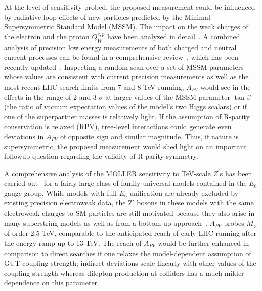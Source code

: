 At the level of sensitivity probed, the proposed measurement could be influenced by radiative loop effects of new 
particles predicted by the Minimal Supersymmetric Standard Model (MSSM). The impact on the weak charges of the
electron and the proton $Q_W^{e,p}$ have been analyzed in detail~\cite{ref:cl:Kurylov:2003zh}. A combined analysis of 
precision low energy measurements of both charged and neutral current processes can be found in a comprehensive review~\cite{ref:cl:RamseyMusolf:2006vr}, which has been recently updated~\cite{ref:cl:Erler:2013xha}. 
Inspecting a random scan over a set of MSSM parameters whose values are consistent with current precision 
measurements as well as the most recent LHC search limits from 7 and 8 TeV running, $A_{PV}$ would see 
in the effects in the range of 2 and 3 $\sigma$ at larger values of the MSSM parameter $\tan\beta$ (the ratio of vacuum expectation values of the model's two Higgs scalars) or if one of the superpartner 
masses is relatively light. 
If the assumption of R-parity conservation is relaxed (RPV), tree-level interactions could generate even deviations 
in $A_{PV}$ of opposite sign and similar magnitude. Thus, if nature is supersymmetric, the proposed measurement
would shed light on an important followup question regarding the validity of R-parity symmetry.

A comprehensive analysis of the MOLLER sensitivity to 
TeV-scale $Z^\prime$s has been carried out~\cite{ref:cl:Erler:2011iw} 
for a fairly large class of family-universal models
contained in the $E_6$ gauge group.  While models with full $E_6$ unification are already
excluded by existing precision electroweak data, the Z' bosons in these models with the same electroweak charges to SM particles are still motivated because 
they also arise in many superstring models as well as from a bottom-up approach~\cite{ref:cl:Erler:2000wu}. 
$A_{PV}$ probes
 $M_{Z^\prime} $ of order 2.5 TeV, comparable to the anticipated reach of 
early LHC running after the energy ramp-up to 13 TeV. The reach of $A_{PV}$ would be further 
enhanced in comparison 
to direct searches if one relaxes the model-dependent assumption of GUT coupling strength; indirect 
deviations scale linearly with other values of the coupling strength whereas dilepton production at colliders
has a much milder dependence on this parameter. 



